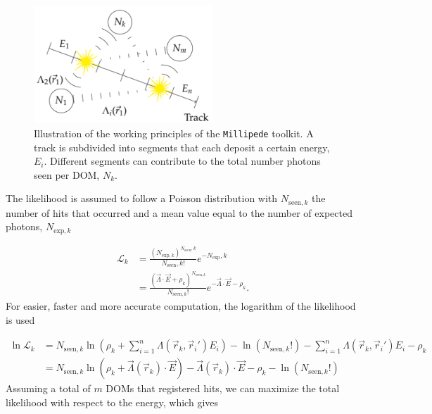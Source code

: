 \begin{figure}
\centering
\includegraphics[width=0.6\textwidth]{chapter7/img/millipede.png}
\caption{Illustration of the working principles of the \texttt{Millipede} toolkit. A track is subdivided into segments that each deposit a certain energy, $E_i$. Different segments can contribute to the total number photons seen per DOM, $N_k$.}
\label{fig:millipede}
\end{figure}

The likelihood is assumed to follow a Poisson distribution with $N_{\textrm{seen},k}$ the number of hits that occurred and a mean value equal to the number of expected photons, $N_{\textrm{exp},k}$

\begin{equation}
\begin{split}
\mathcal{L}_k &= \frac{\left(N_{\textrm{exp},k}\right)^{N_\textrm{seen},k}}{N_\textrm{seen},k!} e^{-N_\textrm{exp},k}\\
&= \frac{\left(\vec{\Lambda} \cdot \vec{E} + \rho_k \right)^{N_{\textrm{seen},k}}}{N_{\textrm{seen},k}!} e^{-\vec{\Lambda} \cdot \vec{E} - \rho_k}.
\end{split}
\end{equation}
\noindent For easier, faster and more accurate computation, the logarithm of the likelihood is used

\begin{equation}
\begin{split}
\ln \mathcal{L}_k &= N_{\textrm{seen},k} \ln \left(\rho_k + \sum^n_{i=1} \Lambda(\vec{r}_k,\vec{r}_i') E_i \right) - \ln \left(N_{\textrm{seen},k}!\right) - \sum^n_{i=1} \Lambda(\vec{r}_k,\vec{r}_i') E_i - \rho_k\\
&= N_{\textrm{seen},k} \ln \left(\rho_k + \vec{\Lambda}(\vec{r}_k) \cdot \vec{E} \right) - \vec{\Lambda}(\vec{r}_k) \cdot \vec{E} - \rho_k - \ln\left(N_{\textrm{seen},k}!\right)
\end{split}
\end{equation}
\noindent Assuming a total of $m$ DOMs that registered hits, we can maximize the total likelihood with respect to the energy, which gives 

